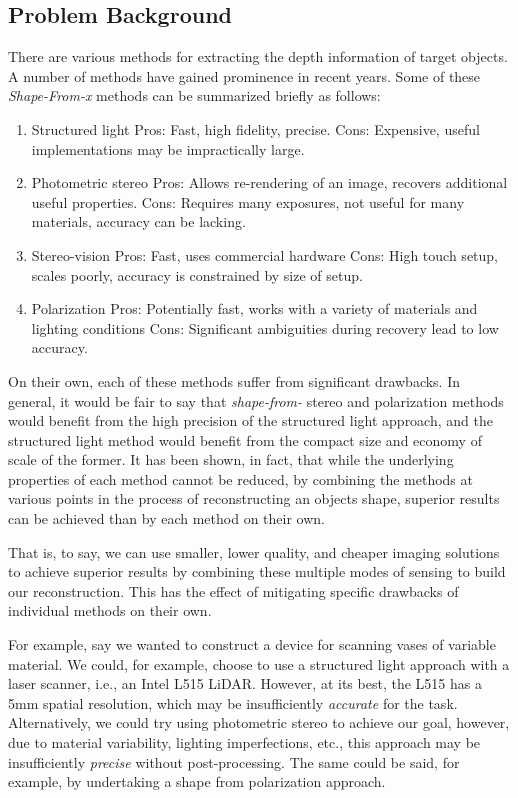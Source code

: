\documentclass[final]{cvpr}
\begin{document}
\subsection{Problem Background}
There are various methods for extracting the depth information of target objects. A number of methods have gained prominence in recent years. Some of these \textit{Shape-From-x} methods can be summarized briefly as follows: 
\begin{enumerate}
	\item Structured light
	\subitem Pros: Fast, high fidelity, precise.
	\subitem Cons: Expensive, useful implementations may be impractically large.
	\item Photometric stereo
	\subitem Pros: Allows re-rendering of an image, recovers additional useful properties.
	\subitem Cons: Requires many exposures, not useful for many materials, accuracy can be lacking.
	\item Stereo-vision
	\subitem Pros: Fast, uses commercial hardware
	\subitem Cons: High touch setup, scales poorly, accuracy is constrained by size of setup.
	\item Polarization
	\subitem Pros: Potentially fast, works with a variety of materials and lighting conditions
	\subitem Cons: Significant ambiguities during recovery lead to low accuracy.
\end{enumerate} 
On their own, each of these methods suffer from significant drawbacks. In general, it would be fair to say that \textit{shape-from-} stereo and polarization methods would benefit from the high precision of the structured light approach, and the structured light method would benefit from the compact size and economy of scale of the former. It has been shown, in fact, that while the underlying properties of each method cannot be reduced, by combining the methods at various points in the process of reconstructing an objects shape, superior results can be achieved than by each method on their own. 

That is, to say, we can use smaller, lower quality, and cheaper imaging solutions to achieve superior results by combining these multiple modes of sensing to build our reconstruction. This has the effect of mitigating specific drawbacks of individual methods on their own. 

For example, say we wanted to construct a device for scanning vases of variable material. We could, for example, choose to use a structured light approach with a laser scanner, i.e., an Intel L515 LiDAR. However, at its best, the L515 has a 5mm spatial resolution, which may be insufficiently \textit{accurate} for the task. Alternatively, we could try using photometric stereo to achieve our goal, however, due to material variability, lighting imperfections, etc., this approach may be insufficiently \textit{precise} without post-processing. The same could be said, for example, by undertaking a shape from polarization approach.
\end{document}
